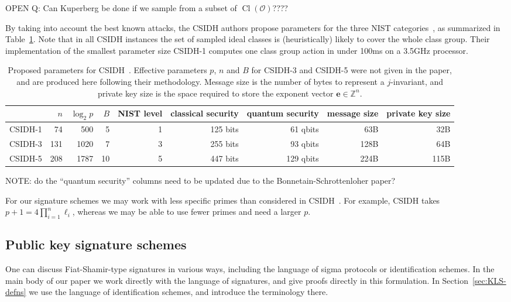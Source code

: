 \documentclass{llncs}
\newcommand{\OO}{\mathcal{O}}
\newcommand{\Z}{\mathbb{Z}}
\DeclareMathOperator{\Cl}{Cl}
\newcommand{\e}{\mathbf{e}}
\begin{document}
OPEN Q: Can Kuperberg be done if we sample from a subset of $\Cl(\OO)$????




By taking into account the best known attacks, the CSIDH authors propose parameters for the three NIST categories~\cite{NIST2016}, as summarized in Table~\ref{tab:csidh-parms}.
Note that in all CSIDH instances the set of sampled ideal classes is (heuristically) likely to cover the whole class group.
Their implementation of the smallest parameter size CSIDH-1 computes one class group action in under 100ms on a 3.5GHz processor.


\begin{table}
  \centering
  \begin{tabular}{l | r | r | r | r | r | r | r | r}
    & $n$ & $\log_2 p$ & $B$ & NIST level & classical security & quantum security & message size & private key size \\
    \hline
    CSIDH-1 &  74 &  500 &  5 & 1 & 125 bits &  61 qbits &  63B &  32B\\
    CSIDH-3 & 131 & 1020 &  7 & 3 & 255 bits &  93 qbits & 128B &  64B\\
    CSIDH-5 & 208 & 1787 & 10 & 5 & 447 bits & 129 qbits & 224B & 115B
  \end{tabular}
  \caption{Proposed parameters for CSIDH~\cite{CLMPR18}.  Effective
    parameters $p$, $n$ and $B$ for CSIDH-3 and CSIDH-5 were not given
    in the paper, and are produced here following their methodology.
    Message size is the number of bytes to represent a $j$-invariant, and private key size is the space required to store the exponent vector $\e \in \Z^n$.}
  \label{tab:csidh-parms}
\end{table}

NOTE: do the ``quantum security'' columns need to be updated due to the Bonnetain-Schrottenloher paper?



For our signature schemes we may work with less specific primes than considered in CSIDH~\cite{CLMPR18}. For example, CSIDH takes $p+1 = 4\prod_{i=1}^n\ell_i$, whereas we may be able to use fewer primes and need a larger $p$.




\subsection{Public key signature schemes}

One can discuss Fiat-Shamir-type signatures in various ways, including the language of sigma protocols or identification schemes.
In the main body of our paper we work directly with the language of signatures, and give proofs directly in this formulation.
In Section~\ref{sec:KLS-defns} we use the language of identification schemes, and introduce the terminology there.
\end{document}
